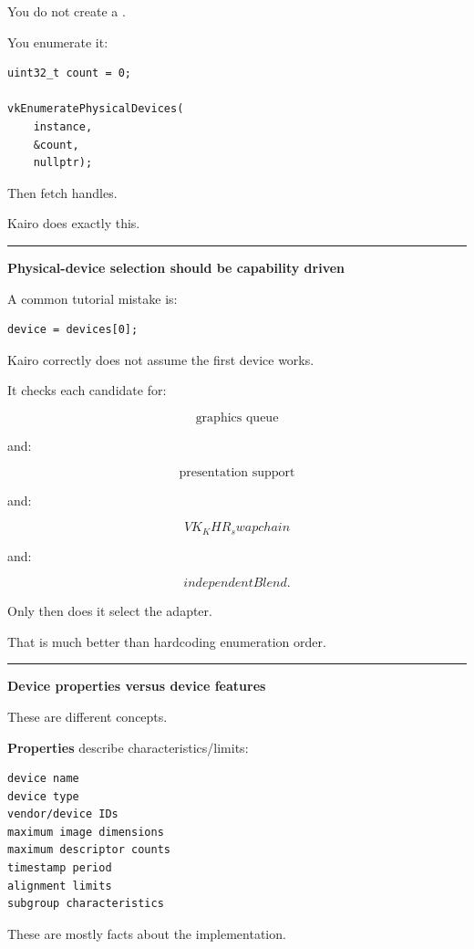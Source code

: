 You do not create a .

You enumerate it:

\begin{verbatim}
uint32_t count = 0;

vkEnumeratePhysicalDevices(
    instance,
    &count,
    nullptr);
\end{verbatim}

Then fetch handles.

Kairo does exactly this.

\begin{center}\rule{0.5\linewidth}{0.5pt}\end{center}

\textbf{Physical-device selection should be capability driven}

A common tutorial mistake is:

\begin{verbatim}
device = devices[0];
\end{verbatim}

Kairo correctly does not assume the first device works.

It checks each candidate for:

\[
\text{graphics queue}
\]

and:

\[
\text{presentation support}
\]

and:

\[
VK_KHR_swapchain
\]

and:

\[
independentBlend.
\]

Only then does it select the adapter.

That is much better than hardcoding enumeration order.

\begin{center}\rule{0.5\linewidth}{0.5pt}\end{center}

\textbf{Device properties versus device features}

These are different concepts.

\textbf{Properties} describe characteristics/limits:

\begin{verbatim}
device name
device type
vendor/device IDs
maximum image dimensions
maximum descriptor counts
timestamp period
alignment limits
subgroup characteristics
\end{verbatim}

These are mostly facts about the implementation.

